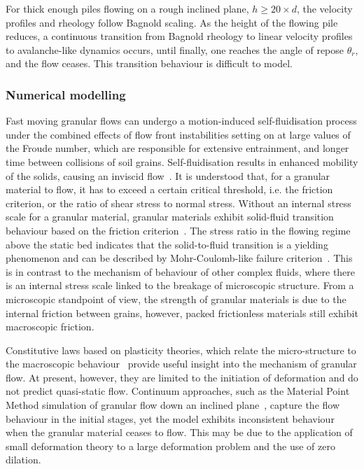 For thick enough piles flowing on a rough inclined plane, $h \ge 20 \times 
d$, the velocity profiles and rheology follow Bagnold scaling. As the height of 
the flowing pile reduces, a continuous transition from Bagnold rheology to
linear velocity profiles to avalanche-like dynamics occurs, until 
finally, one reaches the angle of repose $\theta_r$, and the
flow ceases. This transition behaviour is difficult to model. 

\subsubsection{Numerical modelling}

Fast moving granular flows can undergo a motion-induced self-fluidisation 
process under the combined effects of flow front instabilities setting on at 
large values of the Froude number, which are responsible for extensive 
entrainment, and longer time between collisions of soil grains. 
Self-fluidisation results in enhanced mobility of the solids, causing an 
inviscid flow~\citep{Bareschino2008}. It is understood that, for a granular 
material to flow, it has to exceed a certain critical threshold, i.e. the 
friction criterion, or the ratio of shear stress to normal stress. Without an
internal stress scale for a granular material, granular materials exhibit 
solid-fluid transition behaviour based on the friction 
criterion~\citep{Forterre2008}. The stress ratio in the flowing regime above 
the static bed indicates that the solid-to-fluid transition is a yielding 
phenomenon and can be described by Mohr-Coulomb-like failure 
criterion~\citep{Zhang1992}. This is in contrast to the mechanism of behaviour 
of other complex fluids, where there is an internal stress scale linked to the 
breakage of microscopic structure. From a microscopic standpoint of view, the 
strength of granular materials is due to the internal friction between 
grains, however, packed frictionless materials still exhibit macroscopic 
friction.

Constitutive laws based on plasticity theories, which relate the 
micro-structure to the macroscopic behaviour~\citep{Roux2002} provide 
useful insight into the mechanism of granular flow. At present, however, they 
are limited to the initiation of deformation and do not predict quasi-static 
flow. Continuum approaches, such as the Material Point Method simulation of 
granular flow down 
an inclined plane~\citep{Abe2006,Bandara2013}, capture the flow behaviour in 
the initial stages, yet the model exhibits inconsistent behaviour when the 
granular material ceases to flow. This may be due to the application of small 
deformation theory to a large deformation problem and the use of zero dilation. 

